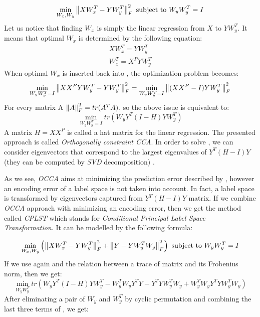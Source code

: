 \begin{equation}\label{eq:cplst1}
    \min_{W_x, W_y} \left\lVert XW_x^T-YW_y^T\right\rVert_{F}^2  
    \text{  subject to   } W_yW_y^T=I   
\end{equation}
Let us notice that finding $W_x$ is simply the linear regression from $X$ to $YW_y^T$. It means that optimal $W_x$ is determined by the following equation:
\begin{equation}\label{eq:cplst2}
\begin{split}
    XW_x^T=YW_y^T \\
    W_x^T=X^PYW_y^T
\end{split}
\end{equation}
When optimal $W_x$ is inserted back into , the optimization problem becomes:
\begin{equation}\label{eq:cplst3}
    \min_{W_yW_y^T=I} \left\lVert XX^PYW_y^T-YW_y^T\right\rVert_{F}^2=\min_{W_yW_y^T=I} \left\lVert(XX^P-I)YW_y^T\right\rVert_{F}^2
\end{equation}
For every matrix A $\left\lVert A\right\rVert_{F}^2=tr(A^TA)$, so the above issue is equivalent to:
\begin{equation}\label{eq:cplst4}
    \min_{W_yW_y^T=I} tr(W_yY^T(I-H)YW_y^T)
\end{equation}
A matrix $H=XX^P$ is called a hat matrix for the linear regression. The presented approach is called \textit{Orthogonally constraint CCA}. In order to solve , we can consider eigenvectors that correspond to the largest eigenvalues of $Y^T(H-I)Y$ (they can be computed by \textit{SVD} decomposition) \cite{ChenLin}.

As we see, \textit{OCCA} aims at minimizing the prediction error described by , however an encoding error of a label space is not taken into account. In fact, a label space is transformed by eigenvectors captured from $Y^T(H-I)Y$ matrix. If we combine \textit{OCCA} approach with minimizing an encoding error, then we get the method called \textit{CPLST} which stands for \textit{Conditional Principal Label Space Transformation}. It can be modelled by the following formula:

\begin{equation}\label{eq:cplst5}
    \min_{W_x, W_y} \left(\left\lVert XW_x^T-YW_y^T\right\rVert_{F}^2 + \left\lVert Y-YW_y^TW_y\right\rVert_{F}^2\right)  
    \text{  subject to   } W_yW_y^T=I   
\end{equation}
If we use again  and the relation between a trace of matrix and its Frobenius norm, then we get:
\begin{equation}\label{eq:cplst6}
    \min_{W_yW_y^T} tr(W_yY^T(I-H)YW_y^T-W_y^TW_yY^TY-Y^TYW_y^TW_y+W_y^TW_yY^TYW_y^TW_y)  
\end{equation}
After eliminating a pair of $W_y$ and $W_y^T$ by cyclic permutation and combining the last three terms of , we get:

